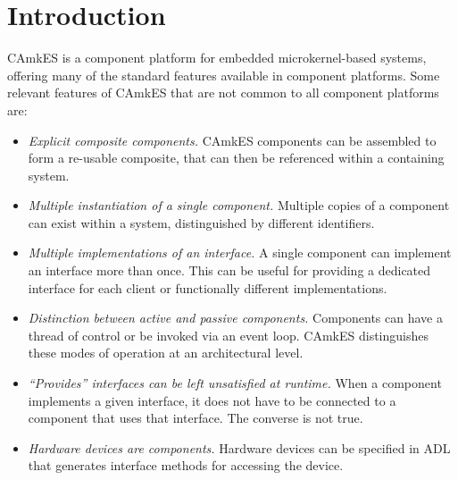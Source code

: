 %
%
%
%

\chapter{Introduction}
CAmkES is a component platform for embedded microkernel-based systems, offering
many of the standard features available in component platforms.
Some relevant features of CAmkES that are not common to all component platforms
are:
\begin{itemize}
  \item \emph{Explicit composite components.} CAmkES components can be
    assembled to form a re-usable composite, that can then be referenced within
    a containing system.
  \item \emph{Multiple instantiation of a single component.} Multiple copies of
    a component can exist within a system, distinguished by different
    identifiers.
  \item \emph{Multiple implementations of an interface.} A single component can
    implement an interface more than once. This can be useful for providing a
    dedicated interface for each client or functionally different
    implementations.
  \item \emph{Distinction between active and passive components.} Components
    can have a thread of control or be invoked via an event loop. CAmkES
    distinguishes these modes of operation at an architectural level.
  \item \emph{``Provides'' interfaces can be left unsatisfied at runtime.} When
    a component implements a given interface, it does not have to be connected
    to a component that uses that interface. The converse is not true.
  \item \emph{Hardware devices are components.} Hardware devices can be
    specified in ADL that generates interface methods for accessing the device.
\end{itemize}
